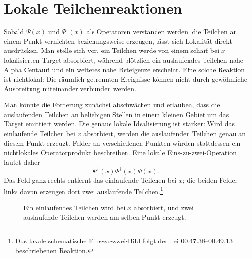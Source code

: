 \begin{classroomqa}
\end{classroomqa}

\section{Lokale Teilchenreaktionen}

Sobald \(\Psi(x)\) und \(\Psi^\dagger(x)\) als Operatoren verstanden werden, die Teilchen an einem Punkt vernichten beziehungsweise erzeugen, lässt sich Lokalität direkt ausdrücken. Man stelle sich vor, ein Teilchen werde von einem scharf bei \(x\) lokalisierten Target absorbiert, während plötzlich ein auslaufendes Teilchen nahe Alpha Centauri und ein weiteres nahe Beteigeuze erscheint. Eine solche Reaktion ist nichtlokal: Die räumlich getrennten Ereignisse können nicht durch gewöhnliche Ausbreitung miteinander verbunden werden.

Man könnte die Forderung zunächst abschwächen und erlauben, dass die auslaufenden Teilchen an beliebigen Stellen in einem kleinen Gebiet um das Target emittiert werden. Die genaue lokale Idealisierung ist stärker: Wird das einlaufende Teilchen bei \(x\) absorbiert, werden die auslaufenden Teilchen genau an diesem Punkt erzeugt. Felder an verschiedenen Punkten würden stattdessen ein nichtlokales Operatorprodukt beschreiben. Eine lokale Eins-zu-zwei-Operation lautet daher
\begin{equation}
\Psi^\dagger(x)\Psi^\dagger(x)\Psi(x).
\end{equation}
Das Feld ganz rechts entfernt das einlaufende Teilchen bei \(x\); die beiden Felder links davon erzeugen dort zwei auslaufende Teilchen.\footnote{Das lokale schematische Eins-zu-zwei-Bild folgt der bei 00:47:38--00:49:13 beschriebenen Reaktion.}

\begin{figure}[t]
\centering
{}
\caption{Ein einlaufendes Teilchen wird bei \(x\) absorbiert, und zwei auslaufende Teilchen werden am selben Punkt erzeugt.}
\end{figure}

